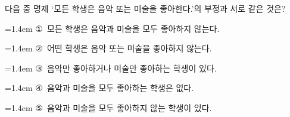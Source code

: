 다음 중 명제 `모든 학생은 음악 또는 미술을 좋아한다.'의 부정과 서로 같은 것은?
\par\medskip\par\noindent\hangindent=1.4em {\small ①}\ 모든 학생은 음악과 미술을 모두 좋아하지 않는다.\par\noindent\hangindent=1.4em {\small ②}\ 어떤 학생은 음악 또는 미술을 좋아하지 않는다.\par\noindent\hangindent=1.4em {\small ③}\ 음악만 좋아하거나 미술만 좋아하는 학생이 있다.\par\noindent\hangindent=1.4em {\small ④}\ 음악과 미술을 모두 좋아하는 학생은 없다.\par\noindent\hangindent=1.4em {\small ⑤}\ 음악과 미술을 모두 좋아하지 않는 학생이 있다.\par\medskip

